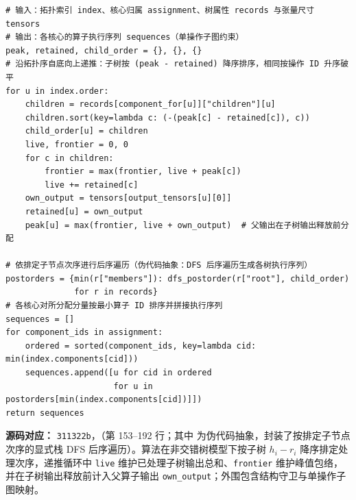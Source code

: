 \documentclass[anonymous,withtoc]{gmcm2026}
\renewcommand{\thealgorithm}{\thesection-\arabic{algorithm}}
\begin{document}
\FloatBarrier\par{}\begingroup\normalsize
\captionsetup{type=algorithm,position=top,justification=raggedright,singlelinecheck=false,labelfont=bf}
\label{alg:p3-forest-memory-order}
\begin{tcolorbox}[enhanced,breakable,colback=white,colframe=black,
  boxrule=0pt,toprule=.4pt,bottomrule=.4pt,sharp corners,boxsep=0pt,
  left=0pt,right=0pt,top=4pt,bottom=4pt,before skip=2pt,after skip=2pt,
  title after break={算法~\thealgorithm（续）},
  colbacktitle=white,coltitle=black,fonttitle=\normalsize\bfseries]



\begin{lstlisting}[style=paperpseudo]
# 输入：拓扑索引 index、核心归属 assignment、树属性 records 与张量尺寸 tensors
# 输出：各核心的算子执行序列 sequences（单操作子图约束）
peak, retained, child_order = {}, {}, {}
# 沿拓扑序自底向上递推：子树按 (peak - retained) 降序排序，相同按操作 ID 升序破平
for u in index.order:
    children = records[component_for[u]]["children"][u]
    children.sort(key=lambda c: (-(peak[c] - retained[c]), c))
    child_order[u] = children
    live, frontier = 0, 0
    for c in children:
        frontier = max(frontier, live + peak[c])
        live += retained[c]
    own_output = tensors[output_tensors[u][0]]
    retained[u] = own_output
    peak[u] = max(frontier, live + own_output)  # 父输出在子树输出释放前分配

# 依排定子节点次序进行后序遍历（伪代码抽象：DFS 后序遍历生成各树执行序列）
postorders = {min(r["members"]): dfs_postorder(r["root"], child_order)
              for r in records}
# 各核心对所分配分量按最小算子 ID 排序并拼接执行序列
sequences = []
for component_ids in assignment:
    ordered = sorted(component_ids, key=lambda cid: min(index.components[cid]))
    sequences.append([u for cid in ordered
                      for u in postorders[min(index.components[cid])]])
return sequences
\end{lstlisting}
\textbf{源码对应：} \texttt{311322b}，\texttt{}（第 153--192 行；其中 \texttt{} 为伪代码抽象，封装了按排定子节点次序的显式栈 DFS 后序遍历）。算法在非交错树模型下按子树 \(h_i - r_i\) 降序排定处理次序，递推循环中 \texttt{live} 维护已处理子树输出总和、\texttt{frontier} 维护峰值包络，并在子树输出释放前计入父算子输出 \texttt{own\_output}；外围包含结构守卫与单操作子图映射。

\end{tcolorbox}\endgroup
\end{document}

